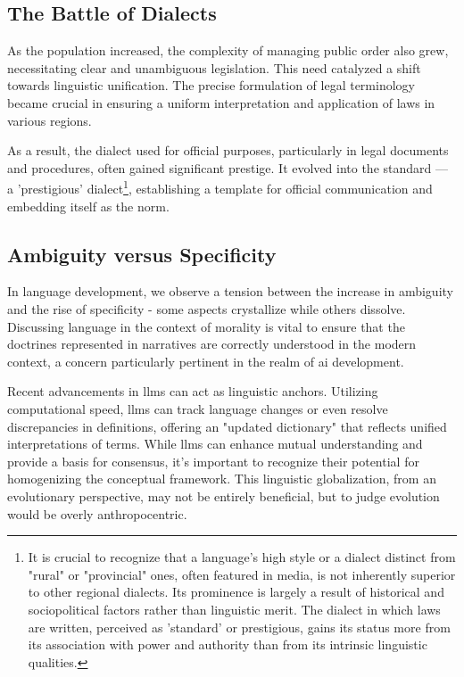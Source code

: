 \documentclass[11pt,a4]{article}
\begin{document}
    \subsection{The Battle of Dialects}
    As the population increased, the complexity of managing public order also grew, necessitating clear and unambiguous legislation. This need catalyzed a shift towards linguistic unification. The precise formulation of legal terminology became crucial in ensuring a uniform interpretation and application of laws in various regions.
    \par
    As a result, the dialect used for official purposes, particularly in legal documents and procedures, often gained significant prestige. It evolved into the standard — a 'prestigious' dialect\footnote{It is crucial to recognize that a language's high style or a dialect distinct from "rural" or "provincial" ones, often featured in media, is not inherently superior to other regional dialects. Its prominence is largely a result of historical and sociopolitical factors rather than linguistic merit. The dialect in which laws are written, perceived as 'standard' or prestigious, gains its status more from its association with power and authority than from its intrinsic linguistic qualities.}, establishing a template for official communication and embedding itself as the norm.

    \subsection{Ambiguity versus Specificity}
    In language development, we observe a tension between the increase in ambiguity and the rise of specificity - some aspects crystallize while others dissolve. Discussing language in the context of morality is vital to ensure that the doctrines represented in narratives are correctly understood in the modern context, a concern particularly pertinent in the realm of \ac{ai} development.
    \par
    Recent advancements in \ac{llms} can act as linguistic anchors.
    Utilizing computational speed, \ac{llms}  can track language changes or even resolve discrepancies in definitions, offering an "updated dictionary" that reflects unified interpretations of terms. While \ac{llms}  can enhance mutual understanding and provide a basis for consensus, it's important to recognize their potential for homogenizing the conceptual framework. This linguistic globalization, from an evolutionary perspective, may not be entirely beneficial, but to judge evolution would be overly anthropocentric.
\end{document}
